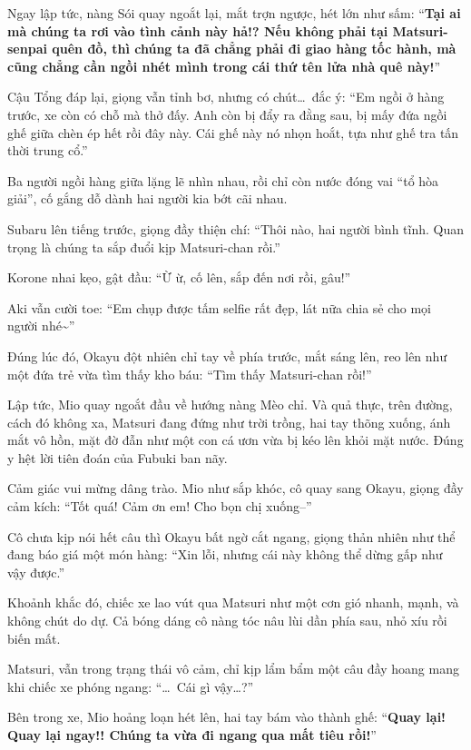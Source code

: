 \documentclass[../main.tex]{subfiles}
\begin{document}
Ngay lập tức, nàng Sói quay ngoắt lại, mắt trợn ngược, hét lớn như sấm: ``\textbf{Tại ai mà chúng ta rơi vào tình cảnh này hả!? Nếu không phải tại Matsuri-senpai quên đồ, thì chúng ta đã chẳng phải đi giao hàng tốc hành, mà cũng chẳng cần ngồi nhét mình trong cái thứ tên lửa nhà quê này!}''

Cậu Tổng đáp lại, giọng vẫn tỉnh bơ, nhưng có chút\dots\ đắc ý: ``Em ngồi ở hàng trước, xe còn có chỗ mà thở đấy. Anh còn bị đẩy ra đằng sau, bị mấy đứa ngồi ghế giữa chèn ép hết rồi đây này. Cái ghế này nó nhọn hoắt, tựa như ghế tra tấn thời trung cổ.''

Ba người ngồi hàng giữa lặng lẽ nhìn nhau, rồi chỉ còn nước đóng vai ``tổ hòa giải'', cố gắng dỗ dành hai người kia bớt cãi nhau.

Subaru lên tiếng trước, giọng đầy thiện chí: ``Thôi nào, hai người bình tĩnh. Quan trọng là chúng ta sắp đuổi kịp Matsuri-chan rồi.''

Korone nhai kẹo, gật đầu: ``Ừ ừ, cố lên, sắp đến nơi rồi, gâu!''

Aki vẫn cười toe: ``Em chụp được tấm selfie rất đẹp, lát nữa chia sẻ cho mọi người nhé\~{}''

Đúng lúc đó, Okayu đột nhiên chỉ tay về phía trước, mắt sáng lên, reo lên như một đứa trẻ vừa tìm thấy kho báu: ``Tìm thấy Matsuri-chan rồi!''

Lập tức, Mio quay ngoắt đầu về hướng nàng Mèo chỉ. Và quả thực, trên đường, cách đó không xa, Matsuri đang đứng như trời trồng, hai tay thõng xuống, ánh mắt vô hồn, mặt đờ đẫn như một con cá ươn vừa bị kéo lên khỏi mặt nước. Đúng y hệt lời tiên đoán của Fubuki ban nãy.


Cảm giác vui mừng dâng trào. Mio như sắp khóc, cô quay sang Okayu, giọng đầy cảm kích: ``Tốt quá! Cảm ơn em! Cho bọn chị xuống--''

Cô chưa kịp nói hết câu thì Okayu bất ngờ cắt ngang, giọng thản nhiên như thể đang báo giá một món hàng: ``Xin lỗi, nhưng cái này không thể dừng gấp như vậy được.''

Khoảnh khắc đó, chiếc xe lao vút qua Matsuri như một cơn gió nhanh, mạnh, và không chút do dự. Cả bóng dáng cô nàng tóc nâu lùi dần phía sau, nhỏ xíu rồi biến mất.


Matsuri, vẫn trong trạng thái vô cảm, chỉ kịp lẩm bẩm một câu đầy hoang mang khi chiếc xe phóng ngang: ``\dots\ Cái gì vậy\dots?''

Bên trong xe, Mio hoảng loạn hét lên, hai tay bám vào thành ghế: ``\textbf{Quay lại! Quay lại ngay!! Chúng ta vừa đi ngang qua mất tiêu rồi!}''
\end{document}
